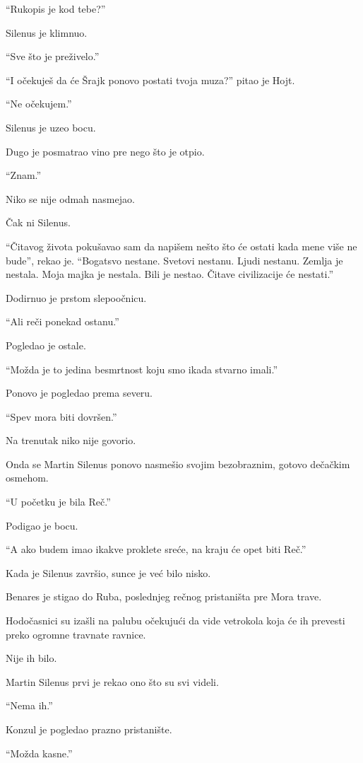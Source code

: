 ``Rukopis je kod tebe?''

Silenus je klimnuo.

``Sve što je preživelo.''

``I očekuješ da će Šrajk ponovo postati tvoja muza?'' pitao je Hojt.

``Ne očekujem.''

Silenus je uzeo bocu.

Dugo je posmatrao vino pre nego što je otpio.

``Znam.''

Niko se nije odmah nasmejao.

Čak ni Silenus.

``Čitavog života pokušavao sam da napišem nešto što će ostati kada mene više ne bude'', rekao je. ``Bogatsvo nestane. Svetovi nestanu. Ljudi nestanu. Zemlja je nestala. Moja majka je nestala. Bili je nestao. Čitave civilizacije će nestati.''

Dodirnuo je prstom slepoočnicu.

``Ali reči ponekad ostanu.''

Pogledao je ostale.

``Možda je to jedina besmrtnost koju smo ikada stvarno imali.''

Ponovo je pogledao prema severu.

``Spev mora biti dovršen.''

Na trenutak niko nije govorio.

Onda se Martin Silenus ponovo nasmešio svojim bezobraznim, gotovo dečačkim osmehom.

``U početku je bila Reč.''

Podigao je bocu.

``A ako budem imao ikakve proklete sreće, na kraju će opet biti Reč.''

\bigskip

Kada je Silenus završio, sunce je već bilo nisko.

Benares je stigao do Ruba, poslednjeg rečnog pristaništa pre Mora trave.

Hodočasnici su izašli na palubu očekujući da vide vetrokola koja će ih prevesti preko ogromne travnate ravnice.

Nije ih bilo.

Martin Silenus prvi je rekao ono što su svi videli.

``Nema ih.''

Konzul je pogledao prazno pristanište.

``Možda kasne.''

